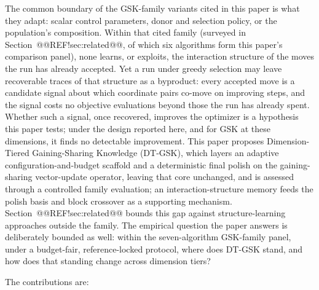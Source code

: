 \documentclass[10pt,a4paper]{article}
\newcommand{\dtgsk}{DT-GSK}
\begin{document}
The common boundary of the GSK-family variants cited in this paper is what
they adapt: scalar control parameters, donor and selection policy, or the
population's composition. Within that cited family (surveyed in
Section~@@REF!sec:related@@, of which six algorithms form this paper's
comparison panel), none learns, or exploits,
the interaction structure of the moves the run has already
accepted. 
Yet a run under greedy selection may leave recoverable traces of that
structure as a byproduct: every accepted move is a candidate signal about
which coordinate pairs co-move on improving steps, and the signal costs no
objective evaluations beyond those the run has already spent. Whether such
a signal, once recovered, improves the optimizer is a hypothesis this paper
tests; under the design reported here, and for GSK at these dimensions, it
finds no detectable improvement. This paper proposes
Dimension-Tiered Gaining-Sharing Knowledge (\dtgsk{}),
which layers an adaptive configuration-and-budget scaffold and a deterministic final polish on the gaining-sharing vector-update operator, leaving that core unchanged, and is assessed through a controlled family evaluation; an interaction-structure memory feeds the polish basis and block crossover as a supporting mechanism. 
Section~@@REF!sec:related@@ bounds this gap against structure-learning
approaches outside the family. The empirical question the paper answers
is deliberately bounded as well: within the seven-algorithm GSK-family
panel, under a budget-fair, reference-locked protocol, where does
\dtgsk{} stand, and how does that standing change across dimension
tiers?

The contributions are:
\end{document}
